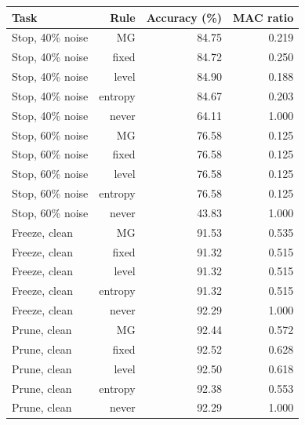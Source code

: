 \begin{tabular}{lrrr}
\toprule
Task & Rule & Accuracy (\%) & MAC ratio \\
\midrule
Stop, 40\% noise & MG & 84.75 & 0.219 \\
Stop, 40\% noise & fixed & 84.72 & 0.250 \\
Stop, 40\% noise & level & 84.90 & 0.188 \\
Stop, 40\% noise & entropy & 84.67 & 0.203 \\
Stop, 40\% noise & never & 64.11 & 1.000 \\
Stop, 60\% noise & MG & 76.58 & 0.125 \\
Stop, 60\% noise & fixed & 76.58 & 0.125 \\
Stop, 60\% noise & level & 76.58 & 0.125 \\
Stop, 60\% noise & entropy & 76.58 & 0.125 \\
Stop, 60\% noise & never & 43.83 & 1.000 \\
Freeze, clean & MG & 91.53 & 0.535 \\
Freeze, clean & fixed & 91.32 & 0.515 \\
Freeze, clean & level & 91.32 & 0.515 \\
Freeze, clean & entropy & 91.32 & 0.515 \\
Freeze, clean & never & 92.29 & 1.000 \\
Prune, clean & MG & 92.44 & 0.572 \\
Prune, clean & fixed & 92.52 & 0.628 \\
Prune, clean & level & 92.50 & 0.618 \\
Prune, clean & entropy & 92.38 & 0.553 \\
Prune, clean & never & 92.29 & 1.000 \\
\bottomrule
\end{tabular}
